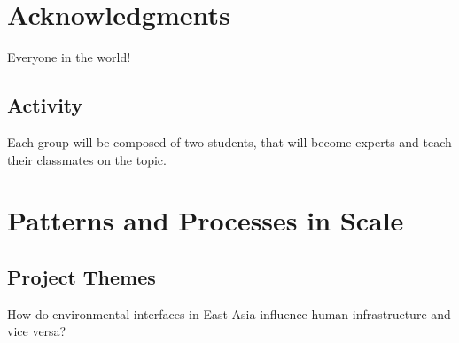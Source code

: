 \section{Acknowledgments}

Everyone in the world!

\subsection{Activity}

Each group will be composed of two students, that will become experts and teach their classmates on the topic. 


\section{Patterns and Processes in Scale}

\subsection{Project Themes}

How do environmental interfaces in East Asia influence human infrastructure and vice versa?

